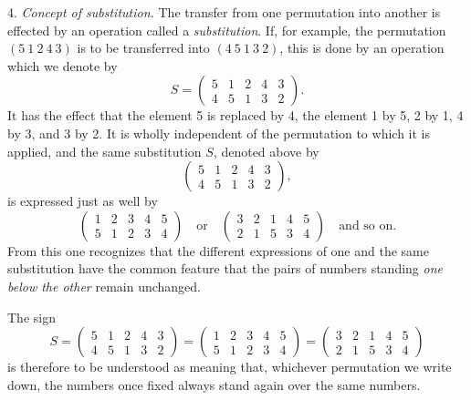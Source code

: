 \documentclass[10pt]{article}
\begin{document}
4. \emph{Concept of substitution.} The transfer from one permutation into another is effected by an operation called a \emph{substitution}. If, for example, the permutation \((5\ 1\ 2\ 4\ 3)\) is to be transferred into \((4\ 5\ 1\ 3\ 2)\), this is done by an operation which we denote by
\[
S=\begin{pmatrix}5&1&2&4&3\\4&5&1&3&2\end{pmatrix}.
\]
It has the effect that the element 5 is replaced by 4, the element 1 by 5, 2 by 1, 4 by 3, and 3 by 2. It is wholly independent of the permutation to which it is applied, and the same substitution \(S\), denoted above by
\[
\begin{pmatrix}5&1&2&4&3\\4&5&1&3&2\end{pmatrix},
\]
is expressed just as well by
\[
\begin{pmatrix}1&2&3&4&5\\5&1&2&3&4\end{pmatrix}
\quad\text{or}\quad
\begin{pmatrix}3&2&1&4&5\\2&1&5&3&4\end{pmatrix}
\quad\text{and so on.}
\]
From this one recognizes that the different expressions of one and the same substitution have the common feature that the pairs of numbers standing \emph{one below the other} remain unchanged.

The sign
\[
S=
\begin{pmatrix}5&1&2&4&3\\4&5&1&3&2\end{pmatrix}
=
\begin{pmatrix}1&2&3&4&5\\5&1&2&3&4\end{pmatrix}
=
\begin{pmatrix}3&2&1&4&5\\2&1&5&3&4\end{pmatrix}
\]
is therefore to be understood as meaning that, whichever permutation we write down, the numbers once fixed always stand again over the same numbers.
\end{document}
